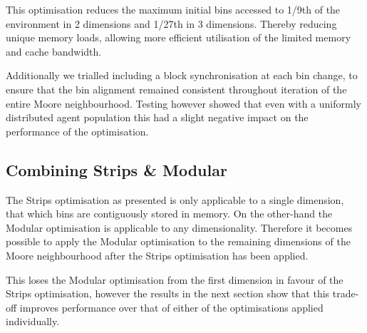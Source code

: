     
    This optimisation reduces the maximum initial bins accessed to 1/9th of the environment in 2 dimensions and 1/27th in 3 dimensions. Thereby reducing unique memory loads, allowing more efficient utilisation of the limited memory and cache bandwidth.
    
    Additionally we trialled including a block synchronisation at each bin change, to ensure that the bin alignment remained consistent throughout iteration of the entire Moore neighbourhood. Testing however showed that even with a uniformly distributed agent population this had a slight negative impact on the performance of the optimisation.

  \subsection{Combining Strips \& Modular}
    The Strips optimisation as presented is only applicable to a single dimension, that which bins are contiguously stored in memory. On the other-hand the Modular optimisation is applicable to any dimensionality. Therefore it becomes possible to apply the Modular optimisation to the remaining dimensions of the Moore neighbourhood after the Strips optimisation has been applied.
    
    This loses the Modular optimisation from the first dimension in favour of the Strips optimisation, however the results in the next section show that this trade-off improves performance over that of either of the optimisations applied individually.
    
    
